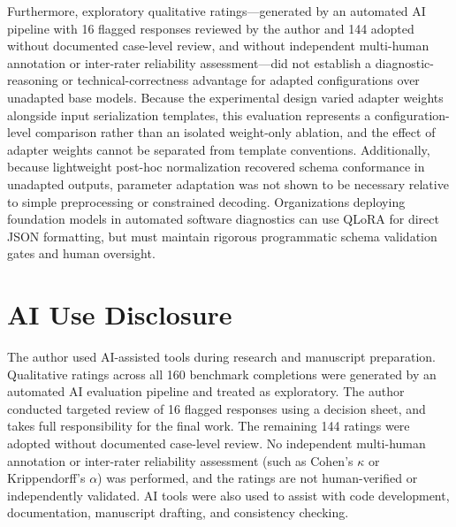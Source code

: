 \documentclass[11pt,a4paper]{article}
\begin{document}
Furthermore, exploratory qualitative ratings—generated by an automated AI pipeline with 16 flagged responses reviewed by the author and 144 adopted without documented case-level review, and without independent multi-human annotation or inter-rater reliability assessment—did not establish a diagnostic-reasoning or technical-correctness advantage for adapted configurations over unadapted base models. Because the experimental design varied adapter weights alongside input serialization templates, this evaluation represents a configuration-level comparison rather than an isolated weight-only ablation, and the effect of adapter weights cannot be separated from template conventions. Additionally, because lightweight post-hoc normalization recovered schema conformance in unadapted outputs, parameter adaptation was not shown to be necessary relative to simple preprocessing or constrained decoding. Organizations deploying foundation models in automated software diagnostics can use QLoRA for direct JSON formatting, but must maintain rigorous programmatic schema validation gates and human oversight.

\section*{AI Use Disclosure}
The author used AI-assisted tools during research and manuscript preparation. Qualitative ratings across all 160 benchmark completions were generated by an automated AI evaluation pipeline and treated as exploratory. The author conducted targeted review of 16 flagged responses using a decision sheet, and takes full responsibility for the final work. The remaining 144 ratings were adopted without documented case-level review. No independent multi-human annotation or inter-rater reliability assessment (such as Cohen's $\kappa$ or Krippendorff's $\alpha$) was performed, and the ratings are not human-verified or independently validated. AI tools were also used to assist with code development, documentation, manuscript drafting, and consistency checking.

\let\oldthebibliography\thebibliography
\renewcommand{\thebibliography}[1]{%
  \oldthebibliography{#1}%
  \small
  \setlength{\itemsep}{1.5pt}%
  \setlength{\parskip}{0pt}%
}


\end{document}

